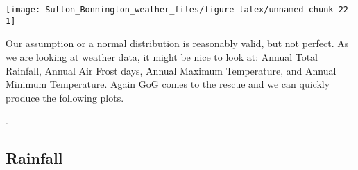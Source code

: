 \documentclass{article}
\begin{document}
\begin{center}\texttt{[image: Sutton\_Bonnington\_weather\_files/figure-latex/unnamed-chunk-22-1]} \end{center}

Our assumption or a normal distribution is reasonably valid, but not perfect. As we are looking at weather data, it might be nice to look at: Annual Total Rainfall, Annual Air Frost days, Annual Maximum Temperature, and Annual Minimum Temperature. Again GoG comes to the rescue and we can quickly produce the following plots.

.

\hypertarget{rainfall}{%
\subsection{Rainfall}\label{rainfall}}
\end{document}
